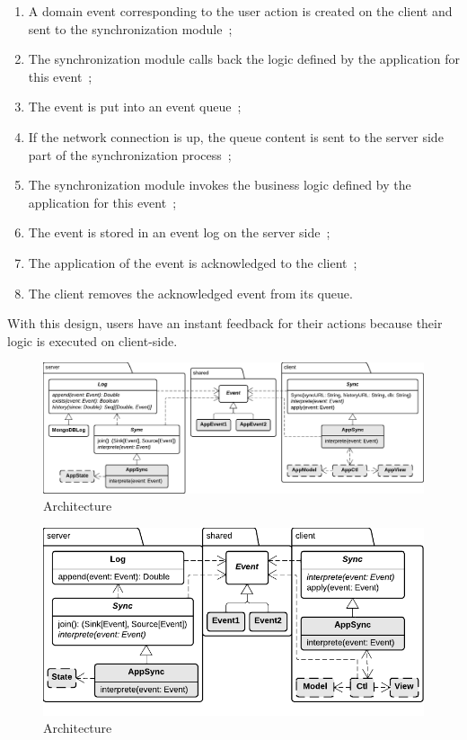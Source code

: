 \documentclass{llncs}
\begin{document}
\begin{enumerate}
 \item A domain event corresponding to the user action is created on the client and sent to the synchronization module~;
 \item The synchronization module calls back the logic defined by the application for this event~;
 \item The event is put into an event queue~;
 \item If the network connection is up, the queue content is sent to the server side part of the synchronization process~;
 \item The synchronization module invokes the business logic defined by the application for this event~;
 \item The event is stored in an event log on the server side~;
 \item The application of the event is acknowledged to the client~;
 \item The client removes the acknowledged event from its queue.
\end{enumerate}

With this design, users have an instant feedback for their actions because their logic is executed on client-side.

\begin{figure}
\centering
\includegraphics[width=18cm,angle=90]{classes.pdf}
\caption{Architecture}
\label{fig-classes}
\end{figure}

\begin{figure}
\centering
\includegraphics[width=12cm]{classes2.pdf}
\caption{Architecture}
\label{fig-classes-2}
\end{figure}
\end{document}

